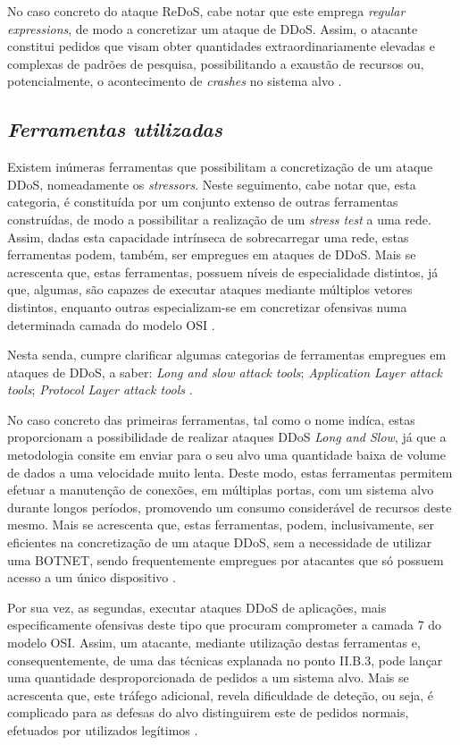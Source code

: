 No caso concreto do ataque ReDoS, cabe notar que este emprega \textit{regular expressions}, de modo a concretizar um ataque de DDoS. Assim, o atacante constitui pedidos que visam obter quantidades extraordinariamente elevadas e complexas de padrões de pesquisa, possibilitando a exaustão de recursos ou, potencialmente, o acontecimento de \textit{crashes} no sistema alvo \cite{esecurityplanet_types_of_ddos_attacks}.


\subsection{\textit{Ferramentas utilizadas}}
Existem inúmeras ferramentas que possibilitam a concretização de um ataque DDoS, nomeadamente os \textit{stressors}. Neste seguimento, cabe notar que, esta categoria, é constituída por um conjunto extenso de outras ferramentas construídas, de modo a possibilitar a realização de um \textit{stress test} a uma rede. Assim, dadas esta capacidade intrínseca de sobrecarregar uma rede, estas ferramentas podem, também, ser empregues em ataques de DDoS. Mais se acrescenta que, estas ferramentas, possuem níveis de especialidade distintos, já que, algumas, são capazes de executar ataques mediante múltiplos vetores distintos, enquanto outras especializam-se em concretizar ofensivas numa determinada camada do modelo OSI \cite{cloudflare_ddos_tools, radware_attack_tools}.


Nesta senda, cumpre clarificar algumas categorias de ferramentas empregues em ataques de DDoS, a saber: \textit{Long and slow attack tools}; \textit{Application Layer attack tools}; \textit{Protocol Layer attack tools} \cite{cloudflare_ddos_tools}.

No caso concreto das primeiras ferramentas, tal como o nome indíca, estas proporcionam a possibilidade de realizar ataques DDoS \textit{Long and Slow}, já que a metodologia consite em enviar para o seu alvo uma quantidade baixa de volume de dados a uma velocidade muito lenta. Deste modo, estas ferramentas permitem efetuar a manutenção de conexões, em múltiplas portas, com um sistema alvo durante longos períodos, promovendo um consumo considerável de recursos deste mesmo. Mais se acrescenta que, estas ferramentas, podem, inclusivamente, ser eficientes na concretização de um ataque DDoS, sem a necessidade de utilizar uma BOTNET, sendo frequentemente empregues por atacantes que só possuem acesso a um único dispositivo \cite{cloudflare_ddos_tools, radware_attack_tools}.


Por sua vez, as segundas, executar ataques DDoS de aplicações, mais especificamente ofensivas deste tipo que procuram comprometer a camada 7 do modelo OSI. Assim, um atacante, mediante utilização destas ferramentas e, consequentemente, de uma das técnicas explanada no ponto II.B.3, pode lançar uma quantidade desproporcionada de pedidos a um sistema alvo. Mais se acrescenta que, este tráfego adicional, revela dificuldade de deteção, ou seja, é complicado para as defesas do alvo distinguirem este de pedidos normais, efetuados por utilizados legítimos \cite{cloudflare_ddos_tools}.


